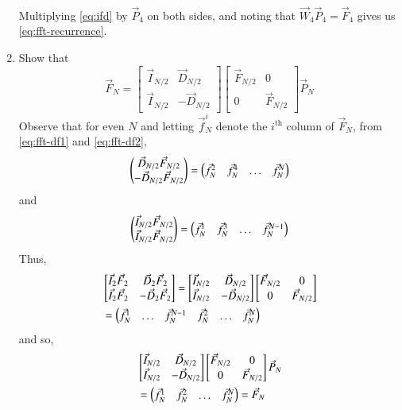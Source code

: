 \documentclass[journal,12pt,twocolumn]{IEEEtran}
\renewcommand\thesection{\arabic{section}}
\newcommand{\mybvec}[1]{\ensuremath{\begin{bmatrix}#1\end{bmatrix}}}
\begin{document}
\begin{enumerate}[label=\thesection.\arabic*]
\begin{align}
	\label{eq:ifd}
\end{align}
Multiplying \eqref{eq:ifd} by $\vec{P}_4$ on both sides, and noting that $\vec{W}_4\vec{P}_4 = \vec{F}_4$ gives us \eqref{eq:fft-recurrence}.
\item Show that 
\begin{equation}
	\vec{F}_{N}=
	\begin{bmatrix}
		\vec{I}_{N/2} & \vec{D}_{N/2} \\
		\vec{I}_{N/2} & -\vec{D}_{N/2}
	\end{bmatrix}
	\begin{bmatrix}
		\vec{F}_{N/2} & 0 \\
		0 & \vec{F}_{N/2}
	\end{bmatrix}
	\vec{P}_{N}
\end{equation}
\solution Observe that for even $N$ and letting $\vec{f}_N^i$ denote the $i^{\text{th}}$ column of $\vec{F}_N$, from \eqref{eq:fft-df1} and \eqref{eq:fft-df2},
\begin{align}
	\begin{pmatrix}\vec{D}_{N/2}\vec{F}_{N/2} \\ -\vec{D}_{N/2}\vec{F}_{N/2}\end{pmatrix} = \begin{pmatrix}\vec{f}_N^{2} & \vec{f}_N^{4} & \ldots & \vec{f}_N^{N}\end{pmatrix}
\end{align}
and
\begin{align}
	\begin{pmatrix}\vec{I}_{N/2}\vec{F}_{N/2} \\ \vec{I}_{N/2}\vec{F}_{N/2}\end{pmatrix} = \begin{pmatrix}\vec{f}_N^{1} & \vec{f}_N^{3} & \ldots & \vec{f}_N^{N - 1}\end{pmatrix}
\end{align}
Thus,
\begin{align}
	&\mybvec{\vec{I}_2\vec{F}_2 & \vec{D}_2\vec{F}_2 \\ \vec{I}_2\vec{F}_2 & -\vec{D}_2\vec{F}_2} = \mybvec{\vec{I}_{N/2} & \vec{D}_{N/2} \\ \vec{I}_{N/2} & -\vec{D}_{N/2}}\mybvec{\vec{F}_{N/2} & 0 \\ 0 & \vec{F}_{N/2}} \nonumber \\
	&= \myvec{\vec{f}_N^{1} & \ldots & \vec{f}_N^{N - 1} & \vec{f}_N^{2} & \ldots & \vec{f}_N^{N}}
\end{align}
and so,
\begin{align}
	&\mybvec{\vec{I}_{N/2} & \vec{D}_{N/2} \\ \vec{I}_{N/2} & -\vec{D}_{N/2}}\mybvec{\vec{F}_{N/2} & 0 \\ 0 & \vec{F}_{N/2}}\vec{P}_{N} \nonumber \\
	&= \myvec{\vec{f}_N^{1} & \vec{f}_N^{2} & \ldots & \vec{f}_N^{N}} = \vec{F}_N
\end{align}

\end{enumerate}
\end{document}

